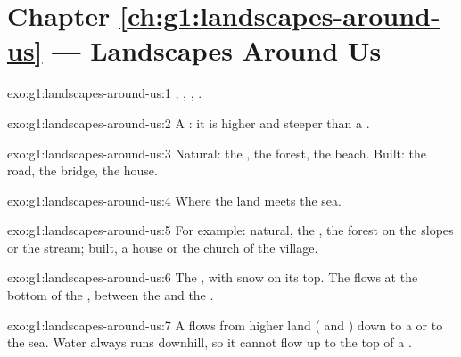 \section*{Chapter \ref{ch:g1:landscapes-around-us} --- Landscapes Around Us}

\begin{solution}{exo:g1:landscapes-around-us:1}
, , , .
\end{solution}

\begin{solution}{exo:g1:landscapes-around-us:2}
A : it is higher and steeper than a .
\end{solution}

\begin{solution}{exo:g1:landscapes-around-us:3}
Natural: the , the forest, the beach. Built: the road, the bridge, the
house.
\end{solution}

\begin{solution}{exo:g1:landscapes-around-us:4}
Where the land meets the sea.
\end{solution}

\begin{solution}{exo:g1:landscapes-around-us:5}
For example: natural, the , the forest on the slopes or the
stream; built, a house or the church of the village.
\end{solution}

\begin{solution}{exo:g1:landscapes-around-us:6}
The , with snow on its top. The  flows at the bottom of the
, between the  and the .
\end{solution}

\begin{solution}{exo:g1:landscapes-around-us:7}
A  flows from higher land ( and ) down to a  or to
the sea. Water always runs downhill, so it cannot flow up to the top of a
.
\end{solution}

